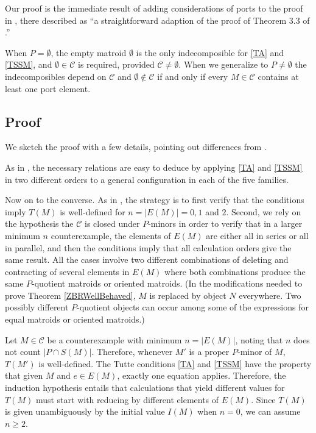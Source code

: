 \documentclass[12pt,leqno]{amsart}
\theoremstyle{remark}
\newcommand{\Card}[1]{\ensuremath{{\left|#1\right|}}}
\begin{document}
Our proof is the immediate result of adding considerations of ports to the
proof in \cite{Ellis-Monaghan-Traldi}, there described
as ``a straightforward adaption of the proof of Theorem 3.3 of 
\cite{MR93a:05047}.''

When $P=\emptyset$, the empty matroid
$\emptyset$ is the only indecomposible
for \eqref{TA} and \eqref{TSSM}, and
$\emptyset\in\mathcal{C}$ is required,
provided $\mathcal{C}\neq \emptyset$.
When we generalize to 
$P\neq\emptyset$
the indecomposibles
depend on $\mathcal{C}$ and  $\emptyset\not\in\mathcal{C}$ if
and only if every $M\in\mathcal{C}$ contains at least one
port element.

\subsection{Proof}
We sketch the proof with a few details, pointing out differences from
\cite{Ellis-Monaghan-Traldi}.

As in \cite{Ellis-Monaghan-Traldi}, 
the necessary relations are easy to deduce by 
applying \eqref{TA} and \eqref{TSSM} in two different
orders to a general configuration in each of the five families.

Now on to the converse.
As in \cite{Ellis-Monaghan-Traldi}, the strategy
is to first verify
that the conditions imply $T(M)$ is well-defined for 
$n = \Card{E(M)} = 0, 1$ and $2$.
Second, we rely on the hypothesis the $\mathcal{C}$ is closed under
$P$-minors in order to verify
that in a larger minimum $n$ counterexample, the elements of
$E(M)$ are either all in series or all in parallel, 
and then the conditions
imply that all calculation orders give the same result.  All the cases involve
two different combinations of deleting and contracting of several elements
in $E(M)$ where both combinations produce the same $P$-quotient matroids
or oriented matroids.  (In the modifications needed to prove
Theorem \ref{ZBRWellBehaved}, 
$M$ is replaced by object $N$ everywhere. Two possibly
different $P$-quotient objects can occur among some of the expressions 
for equal matroids or oriented matroids.)

Let $M\in\mathcal{C}$ be a counterexample with minimum $n=|E(M)|$,
noting that $n$ does not count $|P\cap S(M)|$.
Therefore, whenever $M'$ is a proper $P$-minor of $M$,
$T(M')$ is well-defined.  The Tutte conditions \eqref{TA} and \eqref{TSSM}
have the property that given $M$ and $e\in E(M)$, exactly one equation
applies.  Therefore, the induction hypothesis entails that
calculations that yield different values for $T(M)$ must start with
reducing by different elements of $E(M)$.  Since $T(M)$ is given 
unambiguously by the initial value $I(M)$ when $n=0$, we can assume
$n\geq 2$.
\end{document}

